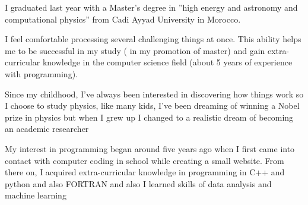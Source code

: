 


I graduated last year with a Master’s degree in ”high energy and astronomy and computational physics” from Cadi Ayyad University in Morocco.



I feel comfortable processing several challenging things at once. This ability helps me to be successful in my study (   in my promotion of master) and gain extra-curricular knowledge in the computer science field (about 5 years of experience with programming).

Since my childhood, I’ve always been interested in discovering how things work so I choose to study physics, like many kids, I've been dreaming of winning a Nobel prize in physics but when I grew up I changed to a realistic dream of becoming an academic researcher

My interest in programming began around five years ago when I first came into contact with computer coding in school while creating a small website. From there on, I acquired  extra-curricular knowledge in programming in C++ and python and also FORTRAN and also I learned skills of data analysis and machine learning 



